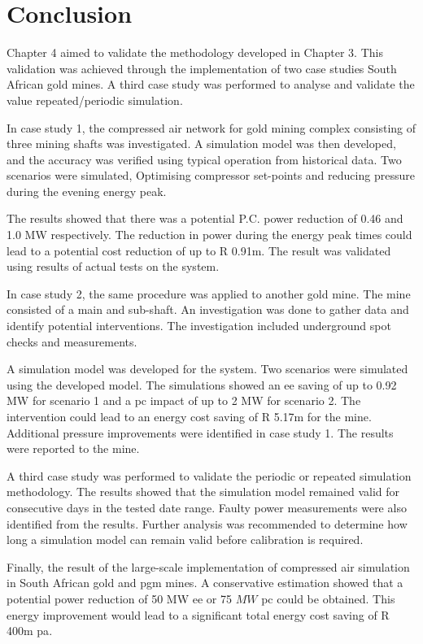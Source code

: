 \section{Conclusion}
Chapter 4 aimed to validate the methodology developed in Chapter 3. This validation was achieved through the implementation of two case studies South African gold mines. A third case study was performed to analyse and validate the value repeated/periodic simulation.
\par 
In case study 1, the compressed air network for gold mining complex consisting of three mining shafts was investigated. A simulation model was then developed, and the accuracy was verified using typical operation from historical data. Two scenarios were simulated, Optimising compressor set-points and reducing pressure during the evening energy peak.
\par 
The results showed that there was a potential P.C. power reduction of 0.46 and 1.0 MW respectively. The reduction in power during the energy peak times could lead to a potential cost reduction of up to R 0.91m. The result was validated using results of actual tests on the system.
\par
In case study 2, the same procedure was applied to another gold mine.  The mine consisted of a main and sub-shaft. An investigation was done to gather data and identify potential interventions. The investigation included underground spot checks and measurements.
\par 
A simulation model was developed for the system. Two scenarios were simulated using the developed model. The simulations showed an \gls{ee} saving of up to 0.92 MW for scenario 1 and a \gls{pc} impact of up to 2 MW for scenario 2. The intervention could lead to an energy cost saving of R 5.17m for the mine. Additional pressure improvements were identified in case study 1. The results were reported to the mine.
\par
A third case study was performed to validate the periodic or repeated simulation methodology. The results showed that the simulation model remained valid for consecutive days in the tested date range. Faulty power measurements were also identified from the results. Further analysis was recommended to determine how long a simulation model can remain valid before calibration is required.
\par 
Finally, the result of the large-scale implementation of compressed air simulation in South African gold and \gls{pgm} mines. A conservative estimation showed that a potential power reduction of 50 MW \gls{ee} or 75 $ MW $ \gls{pc} could be obtained. This energy improvement would lead to a significant total energy cost saving of R 400m \gls{pa}.
